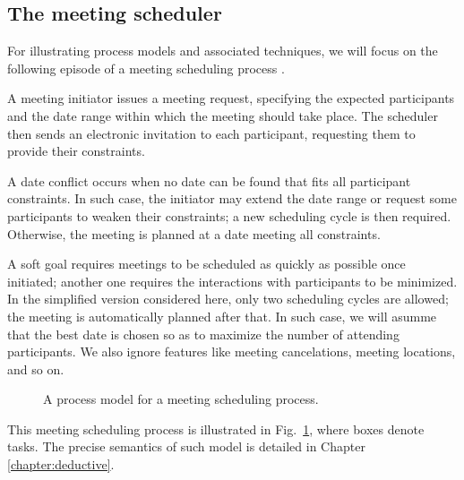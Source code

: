 \subsection{The meeting scheduler\label{subsection:background-meeting-scheduler}}

For illustrating process models and associated techniques, we will focus on the following episode of a meeting scheduling process \cite{Feather:1997}. 

A meeting initiator issues a meeting request, specifying the expected participants and the date range within which the meeting should take place. The scheduler then sends an electronic invitation to each participant, requesting them to provide their constraints. 

A date conflict occurs when no date can be found that fits all participant constraints. In such case, the initiator may extend the date range or request some participants to weaken their constraints; a new scheduling cycle is then required. Otherwise, the meeting is planned at a date meeting all constraints.

A soft goal requires meetings to be scheduled as quickly as possible once initiated; another one requires the interactions with participants to be minimized. In the simplified version considered here, only two scheduling cycles are allowed; the meeting is automatically planned after that. In such case, we will asumme that the best date is chosen so as to maximize the number of attending participants. We also ignore features like meeting cancelations, meeting locations, and so on.

\begin{figure}[H]\centering
{}
\caption{A process model for a meeting scheduling process.\label{image:scheduler-ghmsc}}
\end{figure}

This meeting scheduling process is illustrated in Fig.~\ref{image:scheduler-ghmsc}, where boxes denote tasks. The precise semantics of such model is detailed in Chapter \ref{chapter:deductive}.

